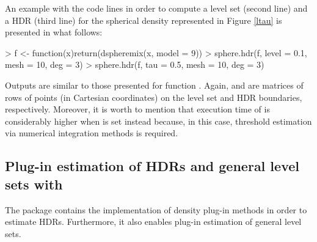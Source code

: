 An example with the code lines in order to compute a level set (second line) and a HDR (third line) for the spherical density represented in Figure \ref{ltau} is presented in what follows:
\begin{example}
> f <- function(x){return(dspheremix(x, model = 9))} 
> sphere.hdr(f, level = 0.1, mesh = 10, deg = 3)
> sphere.hdr(f, tau = 0.5, mesh = 10, deg = 3) 
\end{example}
Outputs are similar to those presented for function . Again,  and  are matrices of rows of points (in Cartesian coordinates) on the level set and HDR boundaries, respectively. Moreover, it is worth to mention that execution time of  is considerably higher when  is set instead  because, in this case, threshold estimation via numerical integration methods is required.



\subsection{Plug-in estimation of HDRs and general level sets with }

The  package contains the implementation of density plug-in methods in order to estimate HDRs. Furthermore, it also enables plug-in estimation of general level sets. 

